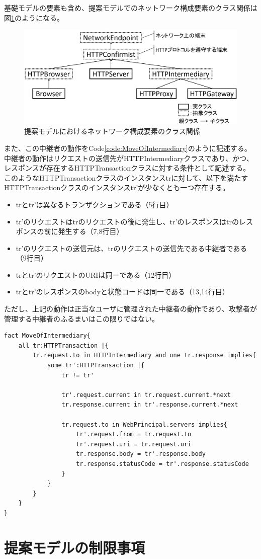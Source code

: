 \documentclass[12pt,a4paper]{jbook}
\begin{document}
基礎モデルの要素も含め、提案モデルでのネットワーク構成要素のクラス関係は図\ref{fig:NetworkComponent}のようになる。

\begin{figure}[htb]
\centering
\includegraphics[width=450pt]{./fig/NetworkComponent.eps}
\caption{提案モデルにおけるネットワーク構成要素のクラス関係}
\label{fig:NetworkComponent}
\end{figure}

また、この中継者の動作をCode\ref{code:MoveOfIntermediary}のように記述する。
中継者の動作はリクエストの送信先がHTTPIntermediaryクラスであり、かつ、レスポンスが存在するHTTPTransactionクラスに対する条件として記述する。
このようなHTTPTransactionクラスのインスタンスtrに対して、以下を満たすHTTPTransactionクラスのインスタンスtr'が少なくとも一つ存在する。
\begin{itemize}
\item trとtr'は異なるトランザクションである（5行目）
\item tr'のリクエストはtrのリクエストの後に発生し、tr'のレスポンスはtrのレスポンスの前に発生する（7,8行目）
\item tr'のリクエストの送信元は、trのリクエストの送信先である中継者である（9行目）
\item trとtr'のリクエストのURIは同一である（12行目）
\item trとtr'のレスポンスのbodyと状態コードは同一である（13,14行目）
\end{itemize}
ただし、上記の動作は正当なユーザに管理された中継者の動作であり、攻撃者が管理する中継者のふるまいはこの限りではない。

\begin{lstlisting}[caption=中継者の動作, label=code:MoveOfIntermediary]
fact MoveOfIntermediary{
	all tr:HTTPTransaction |{
		tr.request.to in HTTPIntermediary and one tr.response implies{
			some tr':HTTPTransaction |{
				tr != tr'				
				
				tr'.request.current in tr.request.current.*next
				tr.response.current in tr'.response.current.*next

				tr.request.to in WebPrincipal.servers implies{
					tr'.request.from = tr.request.to
					tr'.request.uri = tr.request.uri
					tr.response.body = tr'.response.body
					tr.response.statusCode = tr'.response.statusCode
				}
			}
		}
	}
}
\end{lstlisting}

\section{提案モデルの制限事項}
\end{document}

